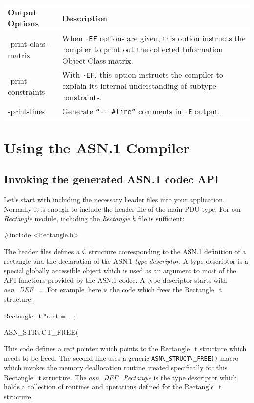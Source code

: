 \documentclass[english,oneside,12pt]{book}
\newcommand{\code}[1]{\lstinline{#1}}
\begin{document}
\begin{longtable}{lp{4in}}
\textbf{Output Options} & \textbf{Description}\\
\midrule
{\ttfamily -print-class-matrix} & {\small When \texttt{-EF} options are given, this option instructs the compiler to print out the collected Information Object Class matrix.}\\
{\ttfamily -print-constraints} & {\small With \texttt{-EF}, this option instructs the compiler
to explain its internal understanding of subtype constraints.}\\
{\ttfamily -print-lines} & {\small Generate \texttt{``-{}- \#line''} comments
in \texttt{-E} output.}\\
\end{longtable}
\renewcommand{\arraystretch}{1}


\chapter{Using the ASN.1 Compiler}


\section[Invoking the codec API]{Invoking the generated ASN.1 codec API}

Let's start with including the necessary header files into your
application. Normally it is enough to include the header file of
the main PDU type. For our \emph{Rectangle} module, including the \emph{Rectangle.h} file is sufficient:
\begin{codesample}
#include <Rectangle.h>
\end{codesample}
The header files defines a C structure corresponding to the ASN.1
definition of a rectangle and the declaration of the ASN.1
\emph{type descriptor}. A type descriptor is a special globally accessible
object which is used as an argument to most of the API functions provided by
the ASN.1 codec. A type descriptor starts with \emph{asn\_DEF\_\ldots{}}. For example, here is the code which frees the Rectangle\_t structure:
\begin{codesample}
Rectangle_t *rect = ...;

ASN_STRUCT_FREE(%
\end{codesample}
This code defines a \emph{rect} pointer which points to the Rectangle\_t
structure which needs to be freed. The second line uses a generic
\code{ASN\_STRUCT\_FREE()} macro which invokes the memory deallocation routine
created specifically for this Rectangle\_t structure.
The \emph{asn\_DEF\_Rectangle} is the type descriptor which holds
a collection of routines and operations defined for the Rectangle\_t structure.
\end{document}
